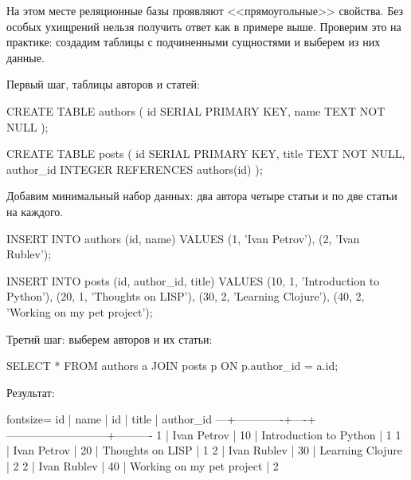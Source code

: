 На этом месте реляционные базы проявляют <<прямоугольные>> свойства. Без особых ухищрений нельзя получить ответ как в примере выше. Проверим это на практике: создадим таблицы с подчиненными сущностями и выберем из них данные.

Первый шаг, таблицы авторов и статей:

\begin{english}
  \begin{sql}
CREATE TABLE authors (
  id SERIAL PRIMARY KEY,
  name TEXT NOT NULL
);

CREATE TABLE posts (
  id SERIAL PRIMARY KEY,
  title TEXT NOT NULL,
  author_id INTEGER REFERENCES authors(id)
);
  \end{sql}
\end{english}

Добавим минимальный набор данных: два автора четыре статьи и по две статьи на каждого.

\begin{english}
  \begin{sql}
INSERT INTO authors (id, name) VALUES
  (1, 'Ivan Petrov'),
  (2, 'Ivan Rublev');

INSERT INTO posts (id, author_id, title) VALUES
  (10, 1, 'Introduction to Python'),
  (20, 1, 'Thoughts on LISP'),
  (30, 2, 'Learning Clojure'),
  (40, 2, 'Working on my pet project');
  \end{sql}
\end{english}

Третий шаг: выберем авторов и их статьи:

\begin{english}
  \begin{sql}
SELECT *
FROM authors a
JOIN posts p
  ON p.author_id = a.id;
  \end{sql}
\end{english}

\pagebreaklarge

Результат:

\begin{english}
  \begin{text*}{fontsize=\small}
id |    name     | id |            title          | author_id
---+-------------+----+---------------------------+----------
 1 | Ivan Petrov | 10 | Introduction to Python    |         1
 1 | Ivan Petrov | 20 | Thoughts on LISP          |         1
 2 | Ivan Rublev | 30 | Learning Clojure          |         2
 2 | Ivan Rublev | 40 | Working on my pet project |         2
  \end{text*}
\end{english}

